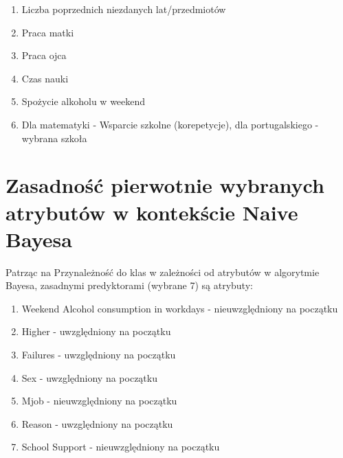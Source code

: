 \documentclass[12pt]{article}
\begin{document}
\begin{enumerate}
	\begin{enumerate}
		\item Liczba poprzednich niezdanych lat/przedmiotów
		\item Praca matki
		\item Praca ojca
		\item Czas nauki
		\item Spożycie alkoholu w weekend
		\item Dla matematyki - Wsparcie szkolne (korepetycje), dla portugalskiego - wybrana szkoła
	\end{enumerate}
\end{enumerate}

\section{Zasadność pierwotnie wybranych atrybutów w kontekście Naive Bayesa}
Patrząc na Przynależność do klas w zależności od atrybutów w algorytmie Bayesa, zasadnymi predyktorami (wybrane 7) są atrybuty:
\begin{enumerate}
	\item Weekend Alcohol consumption in workdays - nieuwzględniony na początku
	\item Higher - uwzględniony na początku
	\item Failures - uwzględniony na początku
	\item Sex - uwzględniony na początku
	\item Mjob - nieuwzględniony na początku
	\item Reason - uwzględniony na początku
	\item School Support - nieuwzględniony na początku
\end{enumerate}
\end{document}
